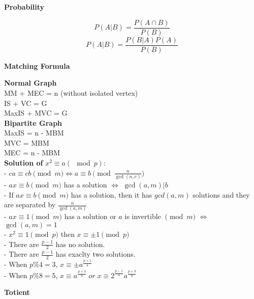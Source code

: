 \textbf{Probability}

\[ P(A|B) = \frac{P(A \cap B)}{P(B)} \]
\[ P(A|B) = \frac{P(B|A)P(A)}{P(B)} \]

\textbf{Matching Formula}

\textbf{Normal Graph} \\
MM + MEC = n (without isolated vertex) \\
IS + VC = G \\
MaxIS + MVC = G \\

\textbf{Bipartite Graph} \\
MaxIS = n - MBM \\
MVC = MBM \\
MEC = n - MBM \\

\textbf{Solution of} \( x^2 \equiv a (\mod p) \):\\
- \( ca \equiv cb \pmod{m} \iff a \equiv b \pmod{ \frac{n}{\gcd(n, c)}} \) \\
- \( ax \equiv b \pmod{m} \) has a solution \( \iff \) \( \gcd(a, m) | b \) \\
- If \( ax \equiv b \pmod{m} \) has a solution, then it has \( gcd(a, m) \) solutions and they are separated by \( \frac{n}{\gcd(a, m)} \) \\
- \( ax \equiv 1 \pmod{m} \) has a solution or \( a \) is invertible \( \pmod{m} \) \( \iff \) \(\gcd(a, m) = 1 \) \\
- \( x^2 \equiv 1 \pmod{p} \) then \( x \equiv \pm 1 \pmod{p} \) \\
- There are \( \frac{p - 1}{2} \) has no solution. \\
- There are \( \frac{p - 1}{2} \) has exaclty two solutions. \\
- When \( p \% 4 = 3 \), \( x \equiv \pm a^{\frac{p + 1}{4}} \) \\
- When \( p \% 8 = 5 \), \( x \equiv a^{\frac{p + 3}{8}} \; or \; x \equiv 2^{\frac{p - 1}{4}} a^{\frac{p + 3}{8}} \)

\textbf{Totient}

